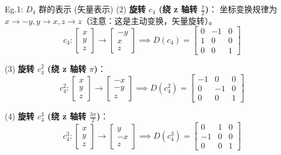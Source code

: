 \begin{example}{Eg.1: $D_4$ 群的表示 (矢量表示)}
    (2) \textbf{旋转 $c_4$ (绕 z 轴转 $\frac{\pi}{2}$)}：
    坐标变换规律为 $x \to -y, y \to x, z \to z$（注意：这是主动变换，矢量旋转）。
    \begin{equation}
        c_4: \begin{bmatrix} x \\ y \\ z \end{bmatrix} \to \begin{bmatrix} -y \\ x \\ z \end{bmatrix} \implies D(c_4) = \begin{bmatrix} 0 & -1 & 0 \\ 1 & 0 & 0 \\ 0 & 0 & 1 \end{bmatrix}
    \end{equation}

    (3) \textbf{旋转 $c_4^2$ (绕 z 轴转 $\pi$)}：
    \begin{equation}
        c_4^2: \begin{bmatrix} x \\ y \\ z \end{bmatrix} \to \begin{bmatrix} -x \\ -y \\ z \end{bmatrix} \implies D(c_4^2) = \begin{bmatrix} -1 & 0 & 0 \\ 0 & -1 & 0 \\ 0 & 0 & 1 \end{bmatrix}
    \end{equation}

    (4) \textbf{旋转 $c_4^3$ (绕 z 轴转 $\frac{3\pi}{2}$)}：
    \begin{equation}
        c_4^3: \begin{bmatrix} x \\ y \\ z \end{bmatrix} \to \begin{bmatrix} y \\ -x \\ z \end{bmatrix} \implies D(c_4^3) = \begin{bmatrix} 0 & 1 & 0 \\ -1 & 0 & 0 \\ 0 & 0 & 1 \end{bmatrix}
    \end{equation}


\end{example}
